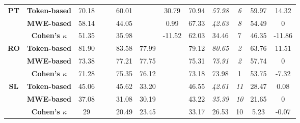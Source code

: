 \documentclass[output=paper
,modfonts
,nonflat,draftmode]{langsci/langscibook}
\begin{document}
\begin{table}
{\begin{tabular}{ccccccccccccc}
\textbf{\scriptsize{}PT} & \textbf{\scriptsize{}Token-based} & {\scriptsize{}70.18} &  &  & {\scriptsize{}60.01} &  & {\scriptsize{}30.79} & {\scriptsize{}70.94} & \emph{\scriptsize{}57.98} & \textit{\scriptsize{}6} & {\scriptsize{}59.97} & {\scriptsize{}14.32}\tabularnewline
 & \textbf{\scriptsize{}MWE-based} & {\scriptsize{}58.14} &  &  & {\scriptsize{}44.05} &  & {\scriptsize{}0.99} & {\scriptsize{}67.33} & \emph{\scriptsize{}42.63} & \textit{\scriptsize{}8} & {\scriptsize{}54.49} & {\scriptsize{}0}\tabularnewline
   & \textbf{\scriptsize{}Cohen's $\kappa$} &\scriptsize{51.35}  &\scriptsize{}  &\scriptsize{}  & \scriptsize{35.98} &\scriptsize{}  &\scriptsize{-11.52}  &\scriptsize{62.03} &\scriptsize{34.46}  &\scriptsize{7} & \scriptsize{46.35} &\scriptsize{-11.86}  \tabularnewline
\midrule 

\textbf{\scriptsize{}RO} & \textbf{\scriptsize{}Token-based} & {\scriptsize{}81.90} &  &  & {\scriptsize{}83.58} & {\scriptsize{}77.99} &  & {\scriptsize{}79.12} & \emph{\scriptsize{}80.65} & \textit{\scriptsize{}2} & {\scriptsize{}63.76} & {\scriptsize{}11.51}\tabularnewline
 & \textbf{\scriptsize{}MWE-based} & {\scriptsize{}73.38} &  &  & {\scriptsize{}77.21} & {\scriptsize{}77.75} &  & {\scriptsize{}75.31} & \emph{\scriptsize{}75.91} & \textit{\scriptsize{}2} & {\scriptsize{}57.74} & {\scriptsize{}0}\tabularnewline
   & \textbf{\scriptsize{}Cohen's $\kappa$} &\scriptsize{71.28}  &\scriptsize{}  &\scriptsize{}  & \scriptsize{75.35} &\scriptsize{76.12}  &\scriptsize{}  &\scriptsize{73.18} &\scriptsize{73.98}  &\scriptsize{1} & \scriptsize{53.75} &\scriptsize{-7.32}  \tabularnewline
\midrule 

\textbf{\scriptsize{}SL} & \textbf{\scriptsize{}Token-based} & {\scriptsize{}45.06} &  &  & {\scriptsize{}45.62} & {\scriptsize{}33.20} &  & {\scriptsize{}46.55} & \emph{\scriptsize{}42.61} & \textit{\scriptsize{}11} & {\scriptsize{}28.47} & {\scriptsize{}0.08}\tabularnewline
 & \textbf{\scriptsize{}MWE-based} & {\scriptsize{}37.08} &  &  & {\scriptsize{}31.08} & {\scriptsize{}30.19} &  & {\scriptsize{}43.22} & \emph{\scriptsize{}35.39} & \textit{\scriptsize{}10} & {\scriptsize{}21.65} & {\scriptsize{}0}\tabularnewline
   & \textbf{\scriptsize{}Cohen's $\kappa$} &\scriptsize{29}  &\scriptsize{}  &\scriptsize{}  & \scriptsize{20.49} &\scriptsize{23.45}  &\scriptsize{}  &\scriptsize{33.17} &\scriptsize{26.53}  &\scriptsize{10} & \scriptsize{5.23} &\scriptsize{-0.07}  \tabularnewline
\midrule 


\end{tabular}}
\end{table}
\end{document}
